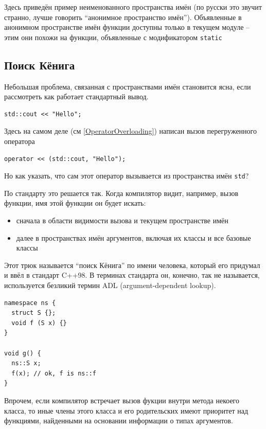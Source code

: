\documentclass[a4paper,12pt,oneside]{book}
\begin{document}
Здесь приведён пример неименованного пространства имён (по русски это звучит странно, лучше говорить ``анонимное пространство имён''). Объявленные в анонимном пространстве имён функции доступны только в текущем модуле -- этим они похожи на функции, объявленные с модификатором \lstinline!static!

\subsection{Поиск Кёнига}\label{subsub:ADL}

Небольшая проблема, связанная с пространствами имён становится ясна, если рассмотреть как работает стандартный вывод.

\begin{lstlisting}
std::cout << "Hello";
\end{lstlisting}

Здесь на самом деле (см \ref{OperatorOverloading}) написан вызов перегруженного оператора

\begin{lstlisting}
operator << (std::cout, "Hello");
\end{lstlisting}

Но как указать, что сам этот оператор вызывается из пространства имён \lstinline!std!?

По стандарту это решается так. Когда компилятор видит, например, вызов функции, имя этой функции он будет искать:

\begin{itemize}
\item
сначала в области видимости вызова и текущем пространстве имён
\item
далее в пространствах имён аргументов, включая их классы и все базовые классы
\end{itemize}

Этот трюк называется ``поиск Кёнига'' по имени человека, который его придумал и ввёл в стандарт C++98. В терминах стандарта он, конечно, так не называется, используется безликий термин ADL (argument-dependent lookup).

\begin{lstlisting}
namespace ns {
  struct S {};
  void f (S x) {}
}

void g() {
  ns::S x;
  f(x); // ok, f is ns::f
}
\end{lstlisting}

Впрочем, если компилятор встречает вызов фукции внутри метода некоего класса, то иные члены этого класса и его родительских имеют приоритет над функциями, найденными на основании информации о типах аргументов.
\end{document}

